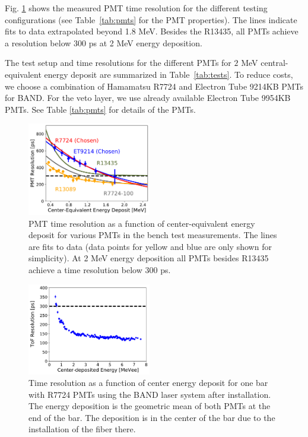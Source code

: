 \documentclass[3p,final,twocolumn]{elsarticle}
\begin{document}
Fig. \ref{fig:test_stand_results} shows the measured PMT time resolution for the different testing configurations (see Table~\ref{tab:pmts} for the PMT properties).
The lines indicate fits to data extrapolated beyond 1.8 \si{\mega\electronvolt}. 
Besides the R13435, all PMTs achieve a resolution below 300 \si{\pico\s} at 2 \si{\mega\electronvolt} energy deposition.

The test setup and time resolutions for the different PMTs for $2$ MeV central-equivalent energy deposit are summarized in Table~\ref{tab:tests}.  
To reduce costs, we choose a combination of Hamamatsu R7724 \cite{pmtR7724} and Electron Tube 9214KB \cite{pmt9214} PMTs for BAND. For the veto layer, we use already available Electron Tube 9954KB PMTs. See Table \ref{tab:pmts} for details of the PMTs.

\begin{figure}[tb]
	\centering
		\includegraphics[width=0.48\textwidth]{all-lines-somedata.pdf}
		\caption{PMT time resolution as a function of center-equivalent energy deposit for various PMTs in the bench test measurements. The lines are fits to data (data points for yellow and blue are only shown for simplicity). At 2 \si{\mega\electronvolt} energy deposition all PMTs besides R13435 achieve a time resolution below 300 \si{\pico\s}.}
	\label{fig:test_stand_results}
\end{figure}

\begin{figure}[tb]
	\centering
		\includegraphics[width=0.48\textwidth]{resolution-laser-scan.pdf}
		\caption{Time resolution as a function of center energy deposit for one bar with R7724 PMTs using the BAND laser system after installation. The energy deposition is the geometric mean of both PMTs at the end of the bar. The deposition is in the center of the bar due to the installation of the fiber there. }
	\label{fig:resolution-laser}
\end{figure}
\end{document}
